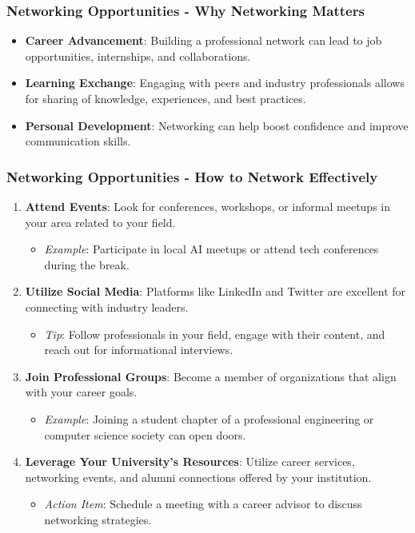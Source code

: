 \documentclass[aspectratio=169]{beamer}
\begin{document}
\begin{frame}[fragile]
    \frametitle{Networking Opportunities - Why Networking Matters}
    \begin{itemize}
        \item \textbf{Career Advancement}: Building a professional network can lead to job opportunities, internships, and collaborations.
        \item \textbf{Learning Exchange}: Engaging with peers and industry professionals allows for sharing of knowledge, experiences, and best practices.
        \item \textbf{Personal Development}: Networking can help boost confidence and improve communication skills.
    \end{itemize}
\end{frame}

\begin{frame}[fragile]
    \frametitle{Networking Opportunities - How to Network Effectively}
    \begin{enumerate}
        \item \textbf{Attend Events}: Look for conferences, workshops, or informal meetups in your area related to your field.
            \begin{itemize}
                \item \textit{Example}: Participate in local AI meetups or attend tech conferences during the break.
            \end{itemize}
        \item \textbf{Utilize Social Media}: Platforms like LinkedIn and Twitter are excellent for connecting with industry leaders.
            \begin{itemize}
                \item \textit{Tip}: Follow professionals in your field, engage with their content, and reach out for informational interviews.
            \end{itemize}
        \item \textbf{Join Professional Groups}: Become a member of organizations that align with your career goals.
            \begin{itemize}
                \item \textit{Example}: Joining a student chapter of a professional engineering or computer science society can open doors.
            \end{itemize}
        \item \textbf{Leverage Your University’s Resources}: Utilize career services, networking events, and alumni connections offered by your institution.
            \begin{itemize}
                \item \textit{Action Item}: Schedule a meeting with a career advisor to discuss networking strategies.
            \end{itemize}
    \end{enumerate}
\end{frame}
\end{document}
